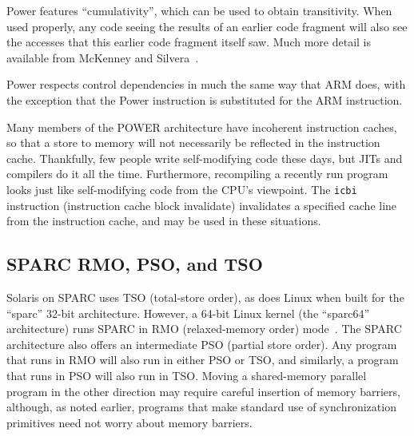 Power features ``cumulativity'', which can be used to obtain
transitivity.
When used properly, any code seeing the results of an earlier
code fragment will also see the accesses that this earlier code
fragment itself saw.
Much more detail is available from
McKenney and Silvera~\cite{PaulEMcKenneyN2745r2009}.

Power respects control dependencies in much the same way that ARM
does, with the exception that the Power  instruction
is substituted for the ARM  instruction.

Many members of the POWER architecture have incoherent instruction
caches, so that a store to memory will not necessarily be reflected
in the instruction cache.
Thankfully, few people write self-modifying code these days, but JITs
and compilers do it all the time.
Furthermore, recompiling a recently run program looks just like
self-modifying code from the CPU's viewpoint.
The {\tt icbi} instruction (instruction cache block invalidate)
invalidates a specified cache line from
the instruction cache, and may be used in these situations.

\subsection{SPARC RMO, PSO, and TSO}

Solaris on SPARC uses TSO (total-store order), as does Linux when built for
the ``sparc'' 32-bit architecture.
However, a 64-bit Linux kernel (the ``sparc64'' architecture)
runs SPARC in RMO (relaxed-memory order) mode~\cite{SPARC94}.
The SPARC architecture also offers an intermediate PSO (partial store
order).
Any program that runs in RMO will also run in either PSO or TSO, and similarly,
a program that runs in PSO will also run in TSO.
Moving a shared-memory parallel program in the other direction may
require careful insertion of memory barriers, although, as noted earlier,
programs that make standard use of synchronization primitives need not
worry about memory barriers.

